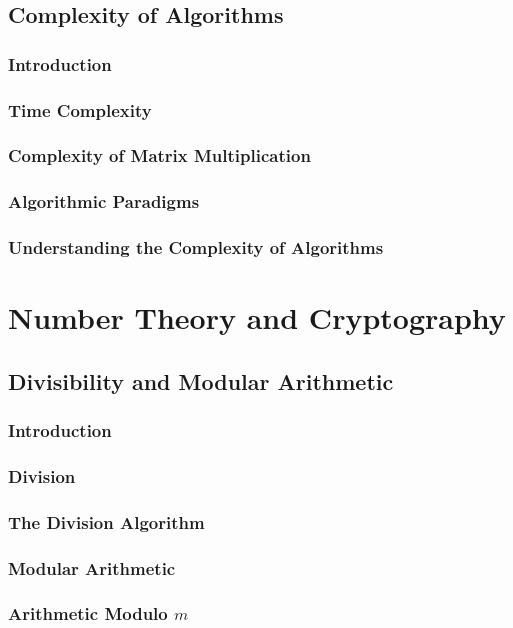 \documentclass[11pt]{book}
\begin{document}
 \section{Complexity of Algorithms}
  \subsection{Introduction}
  \subsection{Time Complexity}
  \subsection{Complexity of Matrix Multiplication}
  \subsection{Algorithmic Paradigms}
  \subsection{Understanding the Complexity of Algorithms}
 
\chapter{Number Theory and Cryptography}
 \section{Divisibility and Modular Arithmetic}
  \subsection{Introduction}
  \subsection{Division}
  \subsection{The Division Algorithm}
  \subsection{Modular Arithmetic}
  \subsection{Arithmetic Modulo $m$}
  
\end{document}
